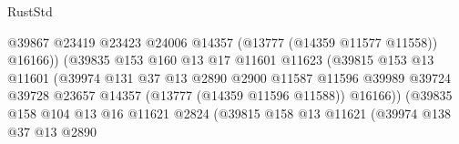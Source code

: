 \begin{lexlean}{RustStd}
\begin{coremodule}
                                              @39867
                                              @23419
                                              @23423
                                              @24006
                                              @14357
                                              (@13777 (@14359 @11577 @11558))
                                              @16166))
                                          (@39835
                                            @153
                                            @160
                                            @13
                                            @17
                                            @11601
                                            @11623
                                            (@39815
                                              @153
                                              @13
                                              @11601
                                              (@39974
                                                @131
                                                @37
                                                @13
                                                @2890
                                                @2900
                                                @11587
                                                @11596
                                                @39989
                                                @39724
                                                @39728
                                                @23657
                                                @14357
                                                (@13777 (@14359 @11596 @11588))
                                                @16166))
                                            (@39835
                                              @158
                                              @104
                                              @13
                                              @16
                                              @11621
                                              @2824
                                              (@39815
                                                @158
                                                @13
                                                @11621
                                                (@39974
                                                  @138
                                                  @37
                                                  @13
                                                  @2890

\end{coremodule}
\end{lexlean}
